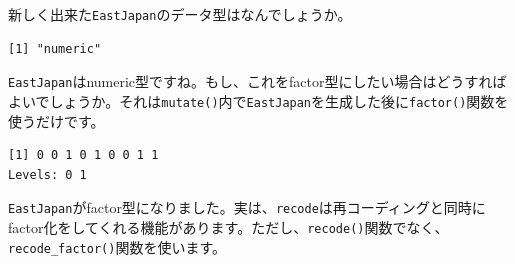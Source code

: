 \documentclass[
  a4paper,
  pandoc,
  ja=standard,
  jafont=haranoaji]{bxjsbook}
\newenvironment{Shaded}{\begin{snugshade}}{\end{snugshade}}
\newcommand{\AttributeTok}[1]{\textcolor[rgb]{0.00,0.48,0.65}{#1}}
\newcommand{\CommentTok}[1]{\textcolor[rgb]{0.37,0.37,0.37}{#1}}
\newcommand{\DecValTok}[1]{\textcolor[rgb]{0.68,0.00,0.00}{#1}}
\newcommand{\FunctionTok}[1]{\textcolor[rgb]{0.28,0.35,0.67}{#1}}
\newcommand{\NormalTok}[1]{\textcolor[rgb]{0.00,0.48,0.65}{#1}}
\newcommand{\OtherTok}[1]{\textcolor[rgb]{0.00,0.48,0.65}{#1}}
\newcommand{\SpecialCharTok}[1]{\textcolor[rgb]{0.37,0.37,0.37}{#1}}
\newcommand{\StringTok}[1]{\textcolor[rgb]{0.13,0.47,0.30}{#1}}
\begin{document}
新しく出来た\texttt{EastJapan}のデータ型はなんでしょうか。

\begin{Shaded}
\end{Shaded}

\begin{verbatim}
[1] "numeric"
\end{verbatim}

\texttt{EastJapan}はnumeric型ですね。もし、これをfactor型にしたい場合はどうすればよいでしょうか。それは\texttt{mutate()}内で\texttt{EastJapan}を生成した後に\texttt{factor()}関数を使うだけです。

\begin{Shaded}
\end{Shaded}

\begin{verbatim}
[1] 0 0 1 0 1 0 0 1 1
Levels: 0 1
\end{verbatim}

\texttt{EastJapan}がfactor型になりました。実は、\texttt{recode}は再コーディングと同時にfactor化をしてくれる機能があります。ただし、\texttt{recode()}関数でなく、\texttt{recode\_factor()}関数を使います。
\end{document}

